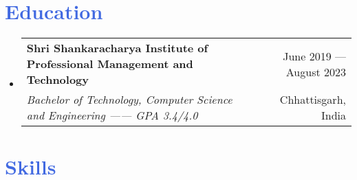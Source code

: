 \documentclass[letterpaper,11pt]{article}
\makeatletter
\newcommand{\resumeItem}[1]{
  \item\small{
    {#1 \vspace{-1pt}}
  }
}
\newcommand{\resumeSubheading}[4]{
  \vspace{-1pt}\item
    \begin{tabular*}{\textwidth}[t]{l@{\extracolsep{\fill}}r}
      \textbf{\small #1} & {\color{dark-grey}\footnotesize #2}\vspace{1pt}\\ %
      \textit{\small #3} & {\color{dark-grey} \footnotesize #4}\\ %
    \end{tabular*}\vspace{-4pt}
}
\newcommand{\resumeSubHeadingListStart}{\begin{itemize}[leftmargin=0in, label={}]}
\newcommand{\resumeSubHeadingListEnd}{\end{itemize}}
\newcommand{\resumeItemListStart}{\begin{itemize}}
\newcommand{\resumeItemListEnd}{\end{itemize}\vspace{0pt}}
\makeatother
\begin{document}
\vspace{-17pt}
\section {\textcolor{RoyalBlue}{Education}}
  \resumeSubHeadingListStart
    \resumeSubheading
      {Shri Shankaracharya Institute of Professional Management and Technology}{June 2019 --- August 2023}
      {Bachelor of Technology, Computer Science and Engineering ------ GPA 3.4/4.0}{Chhattisgarh, India}

  \resumeSubHeadingListEnd



\vspace{-15pt}


\section{\textcolor{RoyalBlue}{Skills}}
 \begin{itemize}[leftmargin=0in, label={}]
    \small{\item{
     \hfill {} \hfill {} \hfill {} \hfill {} \hfill {} \hfill {} \hfill {} \hfill {} \hfill {} \hfill {} \hfill {} \hfill {} \hfill {} \hfill {} \hfill {} \hfill {} \hfill {}}}
 \end{itemize}
\end{document}
